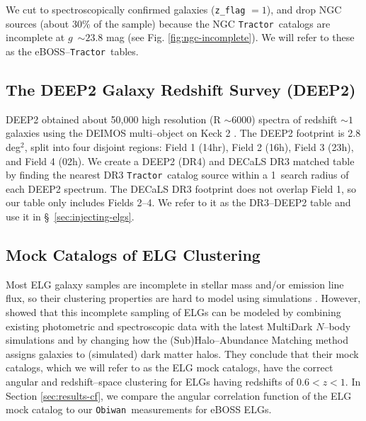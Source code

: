 \documentclass[a4paper,fleqn,usenatbib]{mnras}
\newcommand{\gb}{$g$}
\newcommand{\tractor}{{\tt Tractor}}
\newcommand{\obiwan}{{\tt Obiwan}}
\begin{document}
\noindent We cut to spectroscopically confirmed galaxies (\verb|z_flag| $= 1$), and drop NGC sources (about 30\% of the sample) because the NGC \tractor\, catalogs are incomplete at \gb\, $\sim 23.8$ mag (see Fig. \ref{fig:ngc-incomplete}).
We will refer to these as the eBOSS--\tractor\, tables. 

\subsection{The DEEP2 Galaxy Redshift Survey (DEEP2)}

DEEP2 obtained about 50,000 high resolution (R $\sim 6000$) spectra of redshift $\sim 1$ galaxies using the DEIMOS multi--object on Keck 2 \citep{deep2}. The DEEP2 footprint is 2.8 deg$^2$, split into four disjoint regions: Field 1 (14hr), Field 2 (16h), Field 3 (23h), and Field 4 (02h). We create a DEEP2 (DR4) and DECaLS DR3 matched table by finding the nearest DR3 \tractor\, catalog source within a 1\arcsec\, search radius of each DEEP2 spectrum. The DECaLS DR3 footprint does not overlap Field 1, so our table only includes Fields 2--4. We refer to it as the DR3--DEEP2 table and use it in \S\, \ref{sec:injecting-elgs}.

\subsection{Mock Catalogs of ELG Clustering}
\label{sec:elg-mocks}

Most ELG galaxy samples are incomplete in stellar mass and/or emission line flux, so their clustering properties are hard to model using simulations \citep{johan13}. However, \cite{corrfuncEboss} showed that this incomplete sampling of ELGs can be modeled by combining existing photometric and spectroscopic data with the latest MultiDark $N$--body simulations \citep{multiDark} and by changing how the (Sub)Halo--Abundance Matching method \citep{shamOne, shamTwo} assigns galaxies to (simulated) dark matter halos. They conclude that their mock catalogs, which we will refer to as the ELG mock catalogs, have the correct angular and redshift--space clustering for ELGs having redshifts of $0.6 < z < 1$. In Section \ref{sec:results-cf}, we compare the angular correlation function of the ELG mock catalog
to our \obiwan\, measurements for eBOSS ELGs.

\end{document}
